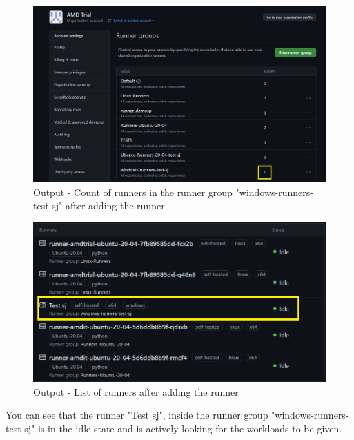 \begin{figure}[H]
\centering
\includegraphics[width = 1\linewidth]{Images/RUNNER3}
\caption{Output - Count of runners in the runner group "windows-runners-test-sj" after adding the runner}
\label{Count of runners in the runner group "windows-runners-test-sj" after adding the runner}
\end{figure}

\begin{figure}[H]
\centering
\includegraphics[width = 1\linewidth]{Images/RUNNER2}
\caption{Output - List of runners after adding the runner}
\label{List of runners after adding the runner}
\end{figure}

You can see that the runner "Test sj", inside the runner group "windows-runners-test-sj" is in the idle state and is actively looking for the workloads to be given.